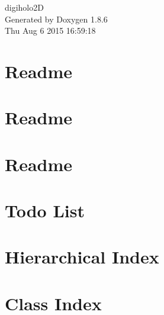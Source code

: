\documentclass[twoside]{book}
\newcommand{\clearemptydoublepage}{%
  \newpage{\pagestyle{empty}\cleardoublepage}%
}
\begin{document}
\hypersetup{pageanchor=false}
\begin{titlepage}
\vspace*{7cm}
\begin{center}%
{\Large digiholo2\-D }\\
\vspace*{1cm}
{\large Generated by Doxygen 1.8.6}\\
\vspace*{0.5cm}
{\small Thu Aug 6 2015 16:59:18}\\
\end{center}
\end{titlepage}
\clearemptydoublepage
\tableofcontents
\clearemptydoublepage
{}
\hypersetup{pageanchor=true}

\chapter{Readme}
\label{md_dist__readme}
\hypertarget{md_dist__readme}{}

\chapter{Readme}
\label{md_imagej__readme}
\hypertarget{md_imagej__readme}{}

\chapter{Readme}
\label{md__readme}
\hypertarget{md__readme}{}

\chapter{Todo List}
\label{todo}
\hypertarget{todo}{}

\chapter{Hierarchical Index}

\chapter{Class Index}

\end{document}
